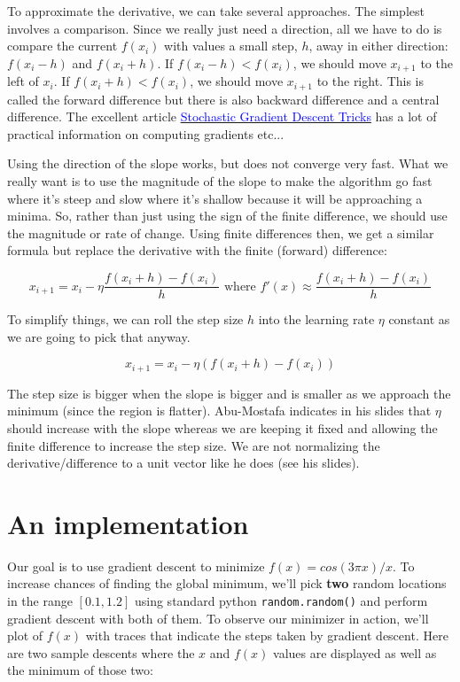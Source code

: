 \documentclass[titlepage]{tufte-book}
\begin{document}
\begin{fullwidth}
To approximate the derivative, we can take several approaches. The simplest involves a comparison. Since we really just need a direction, all we have to do is compare the current $f(x_i)$ with values a small step, $h$, away in either direction: $f(x_{i}-h)$ and $f(x_{i}+h)$.  If $f(x_{i}-h) < f(x_{i})$, we should move $x_{i+1}$ to the left of $x_{i}$. If $f(x_{i}+h) < f(x_{i})$, we should move $x_{i+1}$ to the right.  This is called the forward difference but there is also backward difference and a central difference. The excellent article \href{http://research.microsoft.com/pubs/192769/tricks-2012.pdf}{\textcolor{blue}{Stochastic Gradient Descent Tricks}} has a lot of practical information on computing gradients etc...

Using the direction of the slope works, but does not converge very fast. What we really want is to use the magnitude of the slope to make the algorithm go fast where it's steep and slow where it's shallow because it will be approaching a minima. So, rather than just using the sign of the finite difference, we should use the magnitude or rate of change. Using finite differences then, we get a similar formula but replace the derivative with the finite (forward) difference:

\[
x _{i+1} = x_i - \eta \frac{f(x_{i}+h) - f(x_{i})}{h} \text{ where } f'(x) \approx \frac{f(x_{i}+h) - f(x_{i})}{h}
\]

\noindent To simplify things, we can roll the step size $h$ into the learning rate $\eta$ constant as we are going to pick that anyway.

\[
x _{i+1} = x_i - \eta (f(x_{i}+h) - f(x_{i}))
\]

\noindent  The step size is bigger when the slope is bigger and is smaller as we approach the minimum (since the region is flatter). Abu-Mostafa indicates in his slides that $\eta$ should increase with the slope whereas we are keeping it fixed and allowing the finite difference to increase the step size. We are not normalizing the derivative/difference to a unit vector like he does (see his slides).

\section{An implementation}

Our goal is to use gradient descent to minimize $f(x) = cos(3\pi x) / x$. To increase chances of finding the global minimum, we'll pick {\bf two} random locations in the range $[0.1,1.2]$ using standard python {\tt random.random()} and perform gradient descent with both of them. To  observe our minimizer in action, we'll plot of $f(x)$ with traces that indicate the steps taken by gradient descent. Here are two sample descents where the $x$ and $f(x)$ values are displayed as well as the minimum of those two:


\end{fullwidth}
\end{document}
